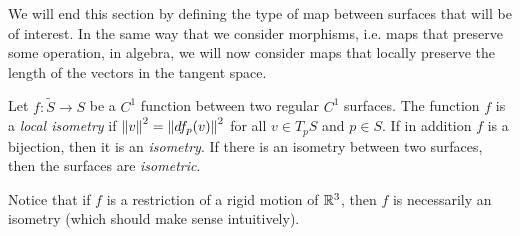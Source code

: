 We will end this section by defining the type of map between surfaces that will be of interest. In the same way that we consider morphisms, i.e. maps that preserve some operation, in algebra, we will now consider maps that locally preserve the length of the vectors in the tangent space. 

\begin{definition}
    Let $f : \tilde{S} \to S$ be a $C^1$ function between two regular $C^1$ surfaces. The function $f$ is a \textit{local isometry} if $\left\lVert v \right\rVert^2 = \left\lVert df_p(v) \right\rVert^2$ for all $v\in T_p S$ and $p \in S$. If in addition $f$ is a bijection, then it is an \textit{isometry}. If there is an isometry between two surfaces, then the surfaces are \textit{isometric}.
\end{definition}

Notice that if $f$ is a restriction of a rigid motion of $\mathbb{R}^3$, then $f$ is necessarily an isometry (which should make sense intuitively).